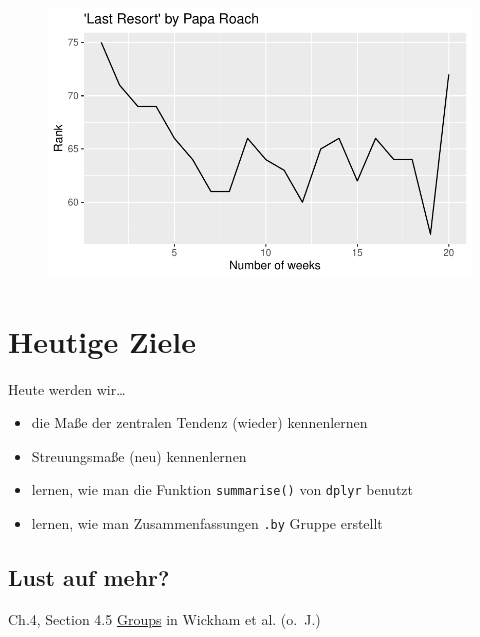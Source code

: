 \documentclass[
  letterpaper,
  DIV=11]{scrartcl}
\providecommand{\tightlist}{%
  \setlength{\itemsep}{0pt}\setlength{\parskip}{0pt}}\usepackage{longtable,booktabs,array}
\begin{document}
\begin{figure}[H]

{\centering \includegraphics{_descr_stats_DE_files/figure-pdf/unnamed-chunk-16-1.pdf}

}

\end{figure}

\hypertarget{heutige-ziele}{%
\section*{Heutige Ziele}\label{heutige-ziele}}

Heute werden wir\ldots{}

\begin{itemize}
\tightlist
\item
  die Maße der zentralen Tendenz (wieder) kennenlernen
\item
  Streuungsmaße (neu) kennenlernen
\item
  lernen, wie man die Funktion \texttt{summarise()} von \texttt{dplyr}
  benutzt
\item
  lernen, wie man Zusammenfassungen \texttt{.by} Gruppe erstellt
\end{itemize}

\hypertarget{lust-auf-mehr}{%
\subsection*{Lust auf mehr?}\label{lust-auf-mehr}}

Ch.4, Section 4.5
\href{https://r4ds.hadley.nz/data-transform.html\#groups}{Groups} in
Wickham et al. (o.~J.)
\end{document}
